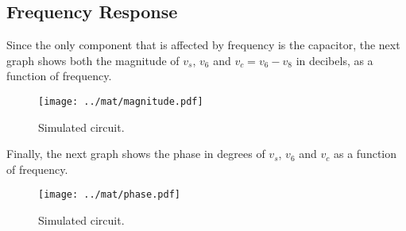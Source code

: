 \subsection{Frequency Response}
Since the only component that is affected by frequency is the capacitor, the next graph shows both the magnitude of $v_s$, $v_6$ and $v_c=v_6 - v_8$ in decibels, as a function of frequency. 

\begin{figure}[H] \centering
\texttt{[image: ../mat/magnitude.pdf]}
\caption{Simulated circuit.}
\label{fig:sim_op}
\end{figure}

Finally, the next graph shows the phase in degrees of $v_s$, $v_6$ and $v_c$ as a function of frequency.

\begin{figure}[H] \centering
\texttt{[image: ../mat/phase.pdf]}
\caption{Simulated circuit.}
\label{fig:sim_op}
\end{figure}


